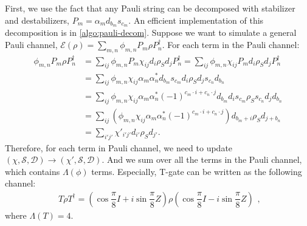 \documentclass[a4paper,accepted=2024-07-10]{quantumarticle}
\newcommand{\scD}{\mathcal{D}}
\newcommand{\scE}{\mathcal{E}}
\newcommand{\scS}{\mathcal{S}}
\begin{document}
First, we use the fact that any Pauli string can be decomposed with stabilizer and destabilizers, $P_m=\alpha_{m}d_{b_{m}}s_{c_{m}}$. An efficient implementation of this decomposition is in \cref{algo:pauli-decom}.  Suppose we want to simulate a general Pauli channel, $\scE(\rho)=\sum_{m,n}\phi_{m,n}P_{m}\rho P_{n}^{\dagger}$. For each term in the Pauli channel:
\begin{equation}
    \begin{split}
        \phi_{m,n}P_m \rho P_n^{\dagger} &= \sum_{ij}\phi_{m,n}P_m \chi_{ij}d_i \rho_{S}d_j P_n^{\dagger}= \sum_{ij}\phi_{m,n}\chi_{ij} P_m d_i \rho_{S}d_j P_n^{\dagger}\\
        & = \sum_{ij}\phi_{m,n}\chi_{ij} \alpha_{m}\alpha^{*}_{n}d_{b_{m}} s_{c_{m}} d_i\rho_{S}d_j s_{c_{n}}d_{b_{n}}\\
        & = \sum_{ij}\phi_{m,n}\chi_{ij} \alpha_{m}\alpha^{*}_{n}(-1)^{c_m\cdot i+c_n\cdot j}d_{b_{m}}d_i s_{c_m}\rho_{S}s_{c_n}d_j d_{b_n}\\
        & = \sum_{ij}\left(\phi_{m,n}\chi_{ij} \alpha_{m}\alpha^{*}_{n}(-1)^{c_m\cdot i+c_n\cdot j}\right) d_{b_m + i}\rho_{S}d_{j+b_n}\\
        & = \sum_{i'j'}\chi'_{i'j'}d_{i'}\rho_{S}d_{j'}.
    \end{split}
\end{equation}
Therefore, for each term in Pauli channel, we need to update $(\chi,\scS,\scD)\rightarrow(\chi',\scS,\scD)$. And we sum over all the terms in the Pauli channel, which contains $\Lambda(\phi)$ terms. Especially, T-gate can be written as the following channel:
\begin{equation}
    \begin{split}
        T \rho T^{\dagger}=\left(\cos \dfrac{\pi}{8}I +i \sin\dfrac{\pi}{8}Z\right)\rho\left(\cos \dfrac{\pi}{8}I -i \sin\dfrac{\pi}{8}Z\right)
    \end{split},
\end{equation}
where $\Lambda(T)=4$.
\end{document}
